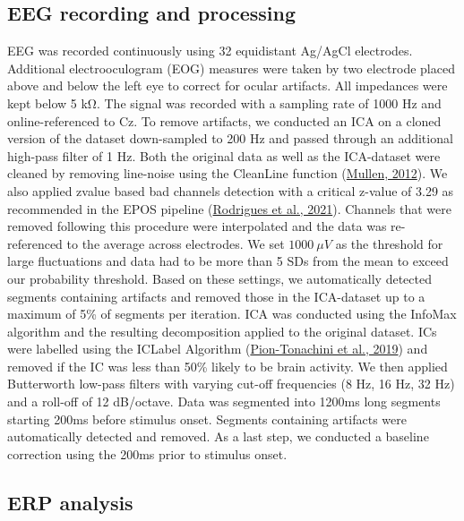 \documentclass[
  man]{apa7}
\begin{document}
\hypertarget{eeg-recording-and-processing}{%
\subsection{EEG recording and processing}\label{eeg-recording-and-processing}}

EEG was recorded continuously using 32 equidistant Ag/AgCl electrodes. Additional electrooculogram (EOG) measures were taken by two electrode placed above and below the left eye to correct for ocular artifacts. All impedances were kept below 5 kΩ. The signal was recorded with a sampling rate of 1000 Hz and online-referenced to Cz. To remove artifacts, we conducted an ICA on a cloned version of the dataset down-sampled to 200 Hz and passed through an additional high-pass filter of 1 Hz. Both the original data as well as the ICA-dataset were cleaned by removing line-noise using the CleanLine function (\protect\hyperlink{ref-mullen2012cleanline}{Mullen, 2012}). We also applied zvalue based bad channels detection with a critical z-value of 3.29 as recommended in the EPOS pipeline (\protect\hyperlink{ref-rodrigues2021epos}{Rodrigues et al., 2021}). Channels that were removed following this procedure were interpolated and the data was re-referenced to the average across electrodes. We set \(1000 \ \mu V\) as the threshold for large fluctuations and data had to be more than 5 SDs from the mean to exceed our probability threshold. Based on these settings, we automatically detected segments containing artifacts and removed those in the ICA-dataset up to a maximum of 5\% of segments per iteration. ICA was conducted using the InfoMax algorithm and the resulting decomposition applied to the original dataset. ICs were labelled using the ICLabel Algorithm (\protect\hyperlink{ref-pion2019iclabel}{Pion-Tonachini et al., 2019}) and removed if the IC was less than 50\% likely to be brain activity. We then applied Butterworth low-pass filters with varying cut-off frequencies (8 Hz, 16 Hz, 32 Hz) and a roll-off of 12 dB/octave. Data was segmented into 1200ms long segments starting 200ms before stimulus onset. Segments containing artifacts were automatically detected and removed. As a last step, we conducted a baseline correction using the 200ms prior to stimulus onset.

\hypertarget{erp-analysis}{%
\subsection{ERP analysis}\label{erp-analysis}}
\end{document}

